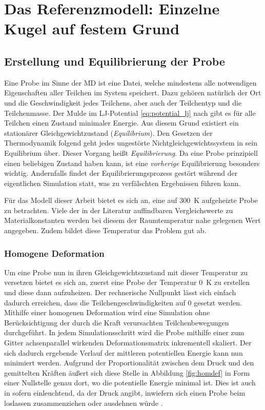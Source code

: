 \chapter{Das Referenzmodell: Einzelne Kugel auf festem Grund}



\section{Erstellung und Equilibrierung der Probe}
	Eine Probe im Sinne der MD ist eine Datei, welche mindestens alle notwendigen Eigenschaften
	aller Teilchen im System speichert. Dazu gehören natürlich der Ort und die Geschwindigkeit
	jedes Teilchens, aber auch der Teilchentyp und die Teilchenmasse. Der Mulde im LJ-Potential
	\eqref{eq:potential_lj} nach gibt es für alle Teilchen einen Zustand minimaler Energie.
	Aus diesem Grund existiert ein stationärer Gleichgewichtzustand (\emph{Equilibrium}). Den
	Gesetzen der Thermodynamik folgend geht jedes ungestörte Nichtgleichgewichtssystem in sein
	Equilibrium über. Dieser Vorgang heißt \emph{Equilibrierung}. Da eine Probe prinzipiell einen
	beliebigen Zustand haben kann, ist eine \emph{vorherige} Equilibrierung besonders wichtig.
	Andernfalls findet der Equilibrierungsprozess gestört während der eigentlichen Simulation
	statt, was zu verfälschten Ergebnissen führen kann.

	Für das Modell dieser Arbeit bietet es sich an, eine auf \SI{300}{\kelvin} aufgeheizte Probe
	zu betrachten. Viele der in der Literatur auffindbaren Vergleichswerte zu Materialkonstanten
	werden bei diesem der Raumtemperatur nahe gelegenen Wert angegeben. Zudem bildet diese
	Temperatur das Problem gut ab.

	\subsection{Homogene Deformation}
		Um eine Probe nun in ihren Gleichgewichtszustand mit dieser Temperatur zu versetzen bietet
		es sich an, zuerst eine Probe der Temperatur \SI{0}{\kelvin} zu erstellen und diese dann
		aufzuheizen. Der rechnerische Nullpunkt lässt sich einfach dadurch erreichen, dass die
		Teilchengeschwindigkeiten auf 0 gesetzt werden. Mithilfe einer homogenen Deformation wird
		eine Simulation ohne Berücksichtigung der durch die Kraft verursachten Teilchenbewegungen
		durchgeführt. In jedem Simulationsschritt wird die Probe mithilfe einer zum Gitter
		achsenparallel wirkenden Deformationsmatrix inkrementell skaliert. Der sich dadurch
		ergebende Verlauf der mittleren potentiellen Energie kann nun minimiert werden. Aufgrund
		der Proportionalität zwischen dem Druck und den gemittelten Kräften äußert sich diese
		Stelle in Abbildung \ref{fig:homdef} in Form einer Nullstelle genau dort, wo die
		potentielle Energie minimal ist. Dies ist auch in sofern einleuchtend, da der Druck
		angibt, inwiefern sich einen Probe beim loslassen zusammenziehen oder ausdehnen würde
		\cite{rapp2014laserablation}.

